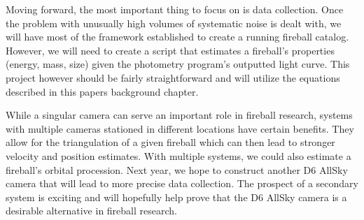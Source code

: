 Moving forward, the most important thing to focus on is data collection.
Once the problem with unusually high volumes of systematic noise is dealt with, we will have most of the framework established to create a running fireball catalog.
However, we will need to create a script that estimates a fireball's properties (energy, mass, size) given the photometry program's outputted light curve.
This project however should be fairly straightforward and will utilize the equations described in this papers background chapter.

While a singular camera can serve an important role in fireball research, systems with multiple cameras stationed in different locations have certain benefits.
They allow for the triangulation of a given fireball which can then lead to stronger velocity and position estimates.
With multiple systems, we could also estimate a fireball's orbital procession.
Next year, we hope to construct another D6 AllSky camera that will lead to more precise data collection. 
The prospect of a secondary system is exciting and will hopefully help prove that the D6 AllSky camera is a desirable alternative in fireball research.
